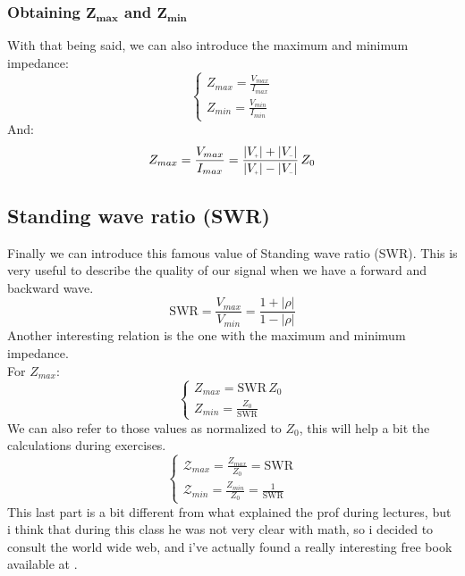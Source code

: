 \subsubsection*{Obtaining $\bm{Z_{max}}$ and $\bm{Z_{min}}$}
With that being said, we can also introduce the maximum and minimum\\
impedance:
\begin{equation}
    \begin{cases}
        Z_{max} = \frac{V_{max}}{I_{max}}\\
        Z_{min} = \frac{V_{min}}{I_{min}}
    \end{cases}
\end{equation}
And:
\begin{equation}
    Z_{max}=\frac{V_{max}}{I_{max}}=\frac{|V\bottomPlus|+|V\bottomMinus|}{|V\bottomPlus|-|V\bottomMinus|}\,Z_0
\end{equation}
\subsection*{Standing wave ratio (SWR)}
Finally we can introduce this famous value of Standing wave ratio (SWR). This is very useful to describe the quality of our signal when we have a forward and backward wave.
\begin{equation}
    \text{SWR}=\frac{V_{max}}{V_{min}}=\frac{1+|\rho|}{1-|\rho|}
\end{equation}
Another interesting relation is the one with the maximum and minimum\\
impedance.\\
For $Z_{max}$:
\begin{equation}
    \begin{cases}
        Z_{max} = \text{SWR}\,Z_0 \\
        Z_{min} = \frac{Z_0}{\text{SWR}}
    \end{cases}
\end{equation}
We can also refer to those values as normalized to $Z_0$, this will help a bit the calculations during exercises.
\begin{equation}
    \begin{cases}\label{eq:normalized_impedance}
        \mathcal{Z}_{max} = \frac{Z_{max}}{Z_0}=\text{SWR}\\
        \mathcal{Z}_{min} = \frac{Z_{min}}{Z_0}=\frac{1}{\text{SWR}}
    \end{cases}
\end{equation}
This last part is a bit different from what explained the prof during lectures, but i think that during this class he was not very clear with math, so i decided to consult the world wide web, and i've actually found a really interesting free book available at \cite{Ellingson2020Book}.
